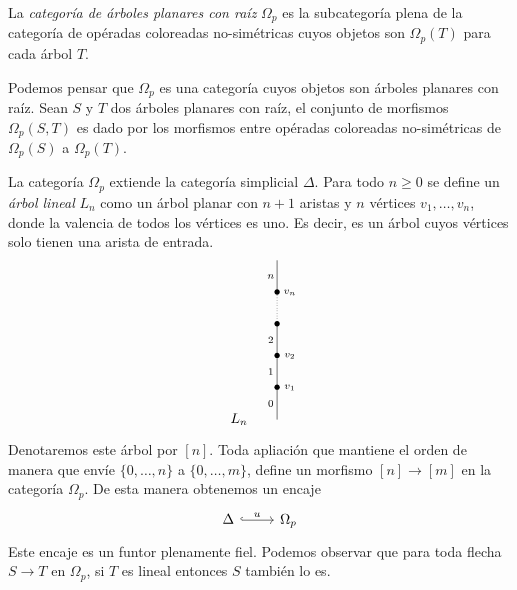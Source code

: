 \documentclass[../main.tex]{subfiles}
\begin{document}
\begin{defi}
    La \emph{categor\'ia de \'arboles planares con ra\'iz} $\Omega_p$ es la subcategor\'ia plena de la categor\'ia de op\'eradas coloreadas no-sim\'etricas cuyos objetos son $\Omega_p(T)$ para cada \'arbol $T$.

    Podemos pensar que $\Omega_p$ es una categor\'ia cuyos objetos son \'arboles planares con ra\'iz.
    Sean $S$ y $T$ dos \'arboles planares con ra\'iz, el conjunto de morfismos $\Omega_p(S, T)$ es dado por los morfismos entre op\'eradas coloreadas no-sim\'etricas de $\Omega_p(S)$ a $\Omega_p(T)$.
\end{defi}
\begin{obs}
    La categor\'ia $\Omega_p$ extiende la categor\'ia simplicial $\Delta$. Para todo $n\ge 0$ se define un \emph{\'arbol lineal} $L_n$ como un \'arbol planar con $n+1$ aristas y $n$ v\'ertices $v_1,\dots,v_n$, donde la valencia de todos los v\'ertices es uno.
    Es decir, es un \'arbol cuyos v\'ertices solo tienen una arista de entrada.
    \begin{equation}
        \xy
        <0.08cm, 0cm>:
        (0.0, 0.0)*{}="1"; %
        (0.0, 10.0)*=0{\bullet}="2"; %
        (0.0, 20.0)*=0{\bullet}="3"; %
        (0.0, 30.0)*=0{\bullet}="4"; %
        (0.0, 40.0)*=0{\bullet}="5"; %
        (0.0, 50.0)*{}="6"; %
        "1";"2" **\dir{-};
        "2";"3" **\dir{-};
        "3";"4" **\dir{-};
        "4";"5" **\dir{.};
        "5";"6" **\dir{-};
        (4.0, 10.0)*=0{\scriptstyle v_1};
        (4.0, 20.0)*=0{\scriptstyle v_2};
        (4.0, 40.0)*=0{\scriptstyle v_n};
        (-2.0, 5.0)*=0{\scriptstyle 0};
        (-2.0, 15.0)*=0{\scriptstyle 1};
        (-2.0, 25.0)*=0{\scriptstyle 2};
        (-2.0, 45.0)*=0{\scriptstyle n};
        (-12,0)*{L_n};
        \endxy
    \end{equation}

    Denotaremos este \'arbol por $[n]$. Toda apliaci\'on que mantiene el orden de manera que env\'ie $\{0,\dots,n\}$ a $\{0,\dots,m\}$, define un morfismo $[n] \to [m]$ en la categor\'ia $\Omega_p$. De esta manera obtenemos un encaje
    $$
        \begin{tikzcd}
            \Delta \arrow[hook]{r}{u} & \Omega_p
        \end{tikzcd}
    $$
    Este encaje es un funtor plenamente fiel. Podemos observar que para toda flecha $S \to T$ en $\Omega_p$, si $T$ es lineal entonces $S$ tambi\'en lo es.
\end{obs}
\end{document}

